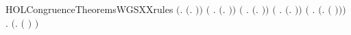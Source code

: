 \newcommand{\HOLCongruenceTheoremsWGSXXind}{\UseVerbatim{HOLCongruenceTheoremsWGSXXind}}
\begin{SaveVerbatim}{HOLCongruenceTheoremsWGSXXrules}
\HOLTokenTurnstile{} \ensuremath{(}\HOLSymConst{\HOLTokenForall{}}.  \ensuremath{(}\HOLTokenLambda{}. \ensuremath{)}\ensuremath{)} \HOLSymConst{\HOLTokenConj{}} \ensuremath{(}\HOLSymConst{\HOLTokenForall{}} .   \HOLSymConst{\HOLTokenImp{}}  \ensuremath{(}\HOLTokenLambda{}. \HOLSymConst{\ensuremath{\ldotp}} \ensuremath{)}\ensuremath{)} \HOLSymConst{\HOLTokenConj{}}
   \ensuremath{(}\HOLSymConst{\HOLTokenForall{}}   .
          \HOLSymConst{\HOLTokenConj{}}   \HOLSymConst{\HOLTokenImp{}}  \ensuremath{(}\HOLTokenLambda{}. \HOLSymConst{\ensuremath{\ldotp}}  \HOLSymConst{\ensuremath{+}} \HOLSymConst{\ensuremath{\ldotp}} \ensuremath{)}\ensuremath{)} \HOLSymConst{\HOLTokenConj{}}
   \ensuremath{(}\HOLSymConst{\HOLTokenForall{}} .   \HOLSymConst{\HOLTokenConj{}}   \HOLSymConst{\HOLTokenImp{}}  \ensuremath{(}\HOLTokenLambda{}.   \HOLSymConst{\ensuremath{\mid}}  \ensuremath{)}\ensuremath{)} \HOLSymConst{\HOLTokenConj{}}
   \ensuremath{(}\HOLSymConst{\HOLTokenForall{}} .   \HOLSymConst{\HOLTokenImp{}}  \ensuremath{(}\HOLTokenLambda{}.   \ensuremath{(} \ensuremath{)}\ensuremath{)}\ensuremath{)} \HOLSymConst{\HOLTokenConj{}}
   \HOLSymConst{\HOLTokenForall{}} .   \HOLSymConst{\HOLTokenImp{}}  \ensuremath{(}\HOLTokenLambda{}.  \ensuremath{(} \ensuremath{)} \ensuremath{)}
\end{SaveVerbatim}
